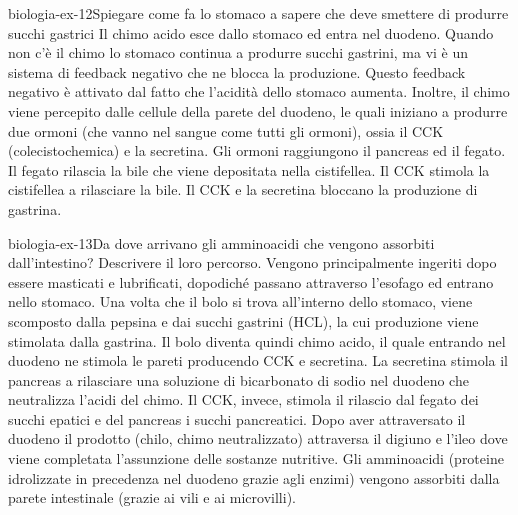 \documentclass[preview]{standalone}
\begin{document}
\begin{snippetexercise}{biologia-ex-12}{Spiegare come fa lo stomaco a sapere che deve smettere di produrre succhi gastrici}
    Il chimo acido esce dallo stomaco ed entra nel duodeno.
    Quando non c'è il chimo lo stomaco continua a produrre succhi gastrini,
    ma vi è un sistema di feedback negativo che ne blocca la produzione.
    Questo feedback negativo è attivato dal fatto che l'acidità dello stomaco aumenta.
    Inoltre, il chimo viene percepito dalle cellule della parete del duodeno, le quali iniziano a produrre
    due ormoni (che vanno nel sangue come tutti gli ormoni), ossia il CCK (colecistochemica) e la secretina.
    Gli ormoni raggiungono il pancreas ed il fegato.
    Il fegato rilascia la bile che viene depositata nella cistifellea.
    Il CCK stimola la cistifellea a rilasciare la bile.
    Il CCK e la secretina bloccano la produzione di gastrina.
\end{snippetexercise}


\begin{snippetexercise}{biologia-ex-13}{Da dove arrivano gli amminoacidi che vengono
    assorbiti dall'intestino? Descrivere il loro percorso.}
    Vengono principalmente ingeriti dopo essere masticati e lubrificati, dopodiché passano attraverso
    l'esofago ed entrano nello stomaco. Una volta che il bolo si trova all'interno dello stomaco,
    viene scomposto dalla pepsina e dai succhi gastrini (HCL), la cui produzione viene stimolata dalla gastrina.
    Il bolo diventa quindi chimo acido, il quale entrando nel duodeno ne stimola le pareti producendo
    CCK e secretina. La secretina stimola il pancreas a rilasciare una soluzione di bicarbonato di sodio
    nel duodeno che neutralizza l'acidi del chimo.
    Il CCK, invece, stimola il rilascio dal fegato dei succhi epatici e del pancreas i succhi pancreatici.
    Dopo aver attraversato il duodeno il prodotto (chilo, chimo neutralizzato) attraversa il digiuno e l'ileo dove
    viene completata l'assunzione delle sostanze nutritive.
    Gli amminoacidi (proteine idrolizzate in precedenza nel duodeno grazie agli enzimi) vengono assorbiti dalla parete intestinale (grazie ai vili e ai microvilli).
\end{snippetexercise}
\end{document}
